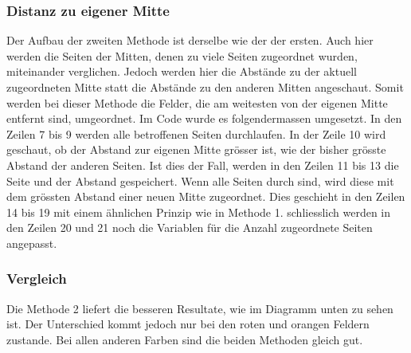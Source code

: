 \documentclass[a4paper, 12pt]{article}
\begin{document}
\subsubsection{Distanz zu eigener Mitte}
Der Aufbau der zweiten Methode ist derselbe wie der der ersten. Auch hier werden die Seiten der Mitten, denen zu viele Seiten zugeordnet wurden, miteinander verglichen. Jedoch werden hier die Abstände zu der aktuell zugeordneten Mitte statt die Abstände zu den anderen Mitten angeschaut. Somit werden bei dieser Methode die Felder, die am weitesten von der eigenen Mitte entfernt sind, umgeordnet.
\newline
Im Code wurde es folgendermassen umgesetzt. In den Zeilen 7 bis 9 werden alle betroffenen Seiten durchlaufen. In der Zeile 10 wird geschaut, ob der Abstand zur eigenen Mitte grösser ist, wie der bisher grösste Abstand der anderen Seiten. Ist dies der Fall, werden in den Zeilen 11 bis 13 die Seite und der Abstand gespeichert. Wenn alle Seiten durch sind, wird diese mit dem grössten Abstand einer neuen Mitte zugeordnet. Dies geschieht in den Zeilen 14 bis 19 mit einem ähnlichen Prinzip wie in Methode 1. schliesslich werden in den Zeilen 20 und 21 noch die Variablen für die Anzahl zugeordnete Seiten angepasst.

\subsubsection{Vergleich}
Die Methode 2 liefert die besseren Resultate, wie im Diagramm unten zu sehen ist. Der Unterschied kommt jedoch nur bei den roten und orangen Feldern zustande. Bei allen anderen Farben sind die beiden Methoden gleich gut. 
\newpage
\end{document}
